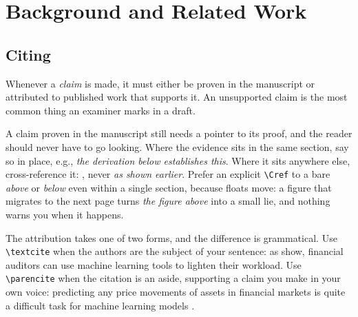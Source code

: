 \chapter{Background and Related Work}
\label{sec:background}

\section{Citing}
\label{sec:citing}

%
%
%
%

Whenever a \emph{claim} is made, it must either be proven in the manuscript or
attributed to published work that supports it. An unsupported claim is the most
common thing an examiner marks in a draft.

A claim proven in the manuscript still needs a pointer to its proof, and the
reader should never have to go looking. Where the evidence sits in the same
section, say so in place, e.g., \emph{the derivation below establishes this}.
Where it sits anywhere else, cross-reference it: , never
\emph{as shown earlier}. Prefer an explicit \texttt{\textbackslash Cref} to a
bare \emph{above} or \emph{below} even within a single section, because floats
move: a figure that migrates to the next page turns \emph{the figure above}
into a small lie, and nothing warns you when it happens.

The attribution takes one of two forms, and the difference is grammatical.
Use \texttt{\textbackslash textcite} when the authors are the subject of your
sentence: as \textcite{sifa2019towards} show, financial auditors can use
machine learning tools to lighten their workload. Use
\texttt{\textbackslash parencite} when the citation is an aside, supporting a
claim you make in your own voice: predicting any price movements of assets in
financial markets is quite a difficult task for machine learning models
\parencite{deusserhillebrand2018cryptocurrencies}.

